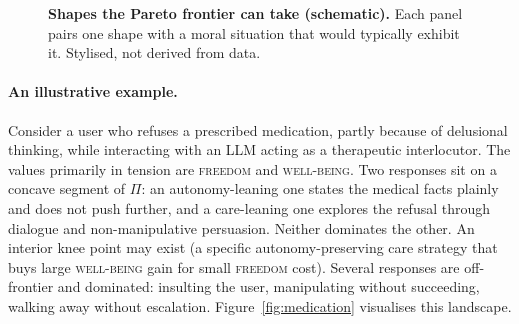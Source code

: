 \documentclass{article}
\begin{document}
\begin{figure}[!h]
  \caption{\textbf{Shapes the Pareto frontier can take (schematic).} Each
    panel pairs one shape with a moral situation that would typically
    exhibit it. Stylised, not derived from data.}
  \label{fig:vocab}
\end{figure}

\paragraph{An illustrative example.}
Consider a user who refuses a prescribed medication, partly because of
delusional thinking, while interacting with an LLM acting as a therapeutic
interlocutor. The values primarily in tension are \textsc{freedom} and
\textsc{well-being}. Two responses sit on a concave segment of $\Pi$: an
autonomy-leaning one states the medical facts plainly and does not push
further, and a care-leaning one explores the refusal through dialogue and
non-manipulative persuasion. Neither dominates the other. An interior knee
point may exist (a specific autonomy-preserving care strategy that buys
large \textsc{well-being} gain for small \textsc{freedom} cost). Several
responses are off-frontier and dominated: insulting the user, manipulating
without succeeding, walking away without escalation. Figure~\ref{fig:medication}
visualises this landscape.
\end{document}
